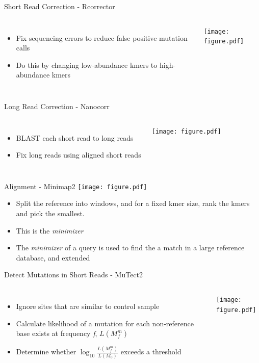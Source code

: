 \documentclass{beamer}
\begin{document}
\begin{frame}{Short Read Correction - Rcorrector}
\begin{columns}
\begin{itemize}
\item Fix sequencing errors to reduce false positive mutation calls
\item Do this by changing low-abundance kmers to high-abundance kmers
\end{itemize}
\texttt{[image: figure.pdf]}
\end{columns}
\end{frame}

\begin{frame}{Long Read Correction - Nanocorr}
\begin{columns}
\begin{itemize}
	\item BLAST each short read to long reads
	\item Fix long reads using aligned short reads
\end{itemize}
\texttt{[image: figure.pdf]}
\end{columns}
\end{frame}

\begin{frame}{Alignment - Minimap2}
\texttt{[image: figure.pdf]}
\begin{itemize}
	\item Split the reference into windows, and for a fixed kmer size, rank the kmers and pick the smallest.
	\item This is the \textit{minimizer}
	\item The \textit{minimizer} of a query is used to find the a match in a large reference database, and extended 
\end{itemize}
\end{frame}

\begin{frame}{Detect Mutations in Short Reads - MuTect2}
\begin{columns}
\begin{itemize}
	\item Ignore sites that are similar to control sample
	\item Calculate likelihood of a mutation for each non-reference base exists at frequency \textit{f}, $L(M^m_f)$
	\item Determine whether $\log_{10} \frac{L(M^m_f)}{L(M_0)}$ exceeds a threshold
\end{itemize}
\texttt{[image: figure.pdf]}
\end{columns}
\end{frame}
\end{document}
